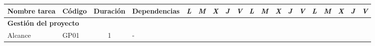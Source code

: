 \begin{table}[h]
\begin{tabular}{|llcllllllllllllllll|}
        \multicolumn{1}{|c|}{\multirow{-2}{*}{\cellcolor[HTML]{FFFFFF}\textbf{Nombre tarea}}}                      & \multicolumn{1}{c|}{\multirow{-2}{*}{\cellcolor[HTML]{FFFFFF}\textbf{Código}}} & \multicolumn{1}{c|}{\multirow{-2}{*}{\cellcolor[HTML]{FFFFFF}\textbf{Duración}}} & \multicolumn{1}{c|}{\multirow{-2}{*}{\cellcolor[HTML]{FFFFFF}\textbf{Dependencias}}} & \multicolumn{1}{l|}{\textit{L}} & \multicolumn{1}{l|}{\textit{M}} & \multicolumn{1}{l|}{\textit{X}} & \multicolumn{1}{l|}{\textit{J}} & \multicolumn{1}{l|}{\textit{V}} & \multicolumn{1}{l|}{\textit{L}} & \multicolumn{1}{l|}{\textit{M}} & \multicolumn{1}{l|}{\textit{X}} & \multicolumn{1}{l|}{\textit{J}} & \multicolumn{1}{l|}{\textit{V}} & \multicolumn{1}{l|}{\textit{L}} & \multicolumn{1}{l|}{\textit{M}} & \multicolumn{1}{l|}{\textit{X}} & \multicolumn{1}{l|}{\textit{J}} & \textit{V}               \\ \hline
        \multicolumn{4}{|l|}{\textbf{Gestión del proyecto}}                                                                                                                                                                                                                                                                                                                   & \multicolumn{15}{l|}{}                                                                                                                                                                                                                                                                                                                                                                                                                                                                                               \\ \hline
        \multicolumn{1}{|l|}{Alcance}                                                                              & \multicolumn{1}{l|}{GP01}                                                      & \multicolumn{1}{c|}{1}                                                           & \multicolumn{1}{l|}{-}                                                               & \cellcolor[HTML]{C6E0B4}        & \cellcolor[HTML]{C6E0B4}        & \cellcolor[HTML]{C6E0B4}        & \cellcolor[HTML]{C6E0B4}        & \cellcolor[HTML]{C6E0B4}        &                                 &                                 &                                 &                                 &                                 &                                 &                                 &                                 &                                 &                          \\ \cline{1-4}

\end{tabular}
\end{table}
